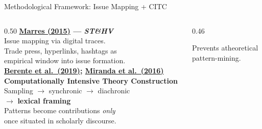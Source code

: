 \documentclass[aspectratio=169,11pt]{beamer}
\newcommand{\iconfull}[2]{\textcolor{#1}{\faIcon{#2}}}
\begin{document}
\begin{frame}{\iconfull{dcblue}{tools}\enspace Methodological Framework: Issue Mapping + CITC}
\begin{columns}[T]
\begin{column}{0.50\textwidth}
  \small\textbf{\href{https://doi.org/10.1177/0162243915574602}{Marres (2015)} — \textit{ST\&HV}}\\[0.3em]
  \footnotesize
  Issue mapping via digital traces.\\
  Trade press, hyperlinks, hashtags as\\
  empirical window into issue formation.\\[0.5em]
  \small\textbf{\href{https://doi.org/10.1287/isre.2018.0774}{Berente et al.\ (2019)}; \href{https://doi.org/10.25300/MISQ/2016/40.2.06}{Miranda et al.\ (2016)}}\\[0.2em]
  \small\textbf{Computationally Intensive Theory Construction}\\[0.3em]
  \footnotesize
  Sampling $\to$ synchronic $\to$ diachronic\\
  $\to$ \textbf{lexical framing}\\[0.3em]
  Patterns become contributions \textit{only}\\
  once situated in scholarly discourse.
\end{column}
\begin{column}{0.46\textwidth}
  \vspace{0.6em}
  \vspace{0.4em}

  \footnotesize\textcolor{dcgray}{Prevents atheoretical\\
  pattern-mining.}
\end{column}
\end{columns}
\end{frame}
\end{document}
